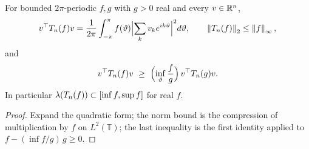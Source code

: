\begin{lemma}\label{lem:toeplitz}
For bounded $2\pi$-periodic $f,g$ with $g>0$ real and every $v\in\mathbb{R}^n$,
\[
 v^\top T_{n}(f)v=\frac1{2\pi}\int_{-\pi}^{\pi}f(\vartheta)\Bigl|\sum_kv_ke^{ik\vartheta}\Bigr|^2d\vartheta,
 \qquad
 \left\lVert T_{n}(f)\right\rVert_2\le\left\lVert f\right\rVert_\infty,
\]
and
\[
 v^\top\Tn{n}{f}v\ \ge\ \Bigl(\inf_\vartheta\frac{f}{g}\Bigr)\,v^\top\Tn{n}{g}v .
\]
In particular $\lambda(T_{n}(f))\subset[\inf f,\sup f]$ for real $f$.
\end{lemma}
\begin{proof}
Expand the quadratic form; the norm bound is the compression of
multiplication by $f$ on $L^2(\mathbb T)$; the last inequality is the first
identity applied to $f-(\inf f/g)\,g\ge0$.
\end{proof}

